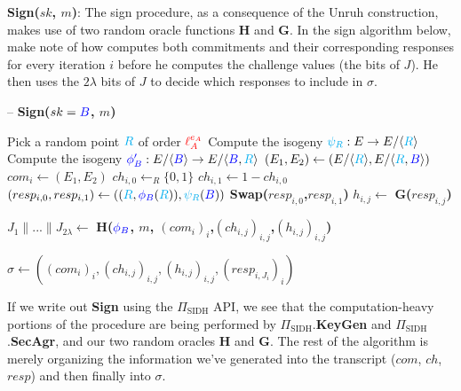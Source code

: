\noindent
\textbf{Sign($sk$, $m$)}: The sign procedure, as a consequence of the Unruh construction, makes use of two random oracle functions \textbf{H} and \textbf{G}. In the sign algorithm below, make note of how \bob computes both commitments and their corresponding responses for every iteration $i$ before he computes the challenge values (the bits of $J$). He then uses the $2\lambda$ bits of $J$ to decide which responses to include in $\sigma$.\\

\begin{algorithm}
\caption{-- \textbf{Sign($sk = \textcolor{blue}{B}$, $m$)}}\label{euclid}
\begin{algorithmic}[1]
	\State Pick a random point $\textcolor{cyan}{R}$ of order $\textcolor{red}{\ell_{A}^{e_A}}$
	\State Compute the isogeny $\textcolor{cyan}{\psi_R}: E \rightarrow E/\langle \textcolor{cyan}{R} \rangle$
	\State Compute the isogeny $\textcolor{blue}{\phi'_B} : E/\langle \textcolor{blue}{B} \rangle \rightarrow E/\langle \textcolor{blue}{B},\textcolor{cyan}{R} \rangle$
	\State $(E_{1},E_{2}) \gets (E/\langle \textcolor{cyan}{R} \rangle, E/\langle \textcolor{cyan}{R},\textcolor{blue}{B} \rangle)$
	\State $com_{i} \gets (E_{1}, E_{2})$
	\State $ch_{i,0} \gets_{R} \{0,1\}$
	\State $ch_{i,1} \gets 1 - ch_{i,0}$
	\State $(resp_{i,0}, resp_{i,1}) \gets ((\textcolor{cyan}{R},\textcolor{blue}{\phi_B}(\textcolor{cyan}{R})), \textcolor{cyan}{\psi_R}(\textcolor{blue}{B}))$
		\State \textbf{Swap($resp_{i,0}$,$resp_{i,1}$)}
	\EndIf
	\State $h_{i,j} \gets$ \textbf{G($resp_{i,j}$)}
\EndFor

\State $J_{1} \parallel ... \parallel J_{2\lambda} \gets$ \textbf{H($\textcolor{blue}{\phi_B}$, $m$, $(com_{i})_{i}$,$(ch_{i,j})_{i,j}$,$(h_{i,j})_{i,j}$)}

\State \Return $\sigma \gets ((com_{i})_{i}, (ch_{i,j})_{i,j}, (h_{i,j})_{i,j}, (resp_{i,J_{i}})_{i})$
\end{algorithmic}
\end{algorithm}

\noindent
If we write out \textbf{Sign} using the $\Pi_{\text{SIDH}}$ API, we see that the computation-heavy portions of the procedure are being performed by $\Pi_{\text{SIDH}}$.\textbf{KeyGen} and $\Pi_{\text{SIDH}}$.\textbf{SecAgr}, and our two random oracles \textbf{H} and \textbf{G}.  The rest of the algorithm is merely organizing the information we've generated into the transcript ($com$, $ch$, $resp$) and then finally into $\sigma$.

